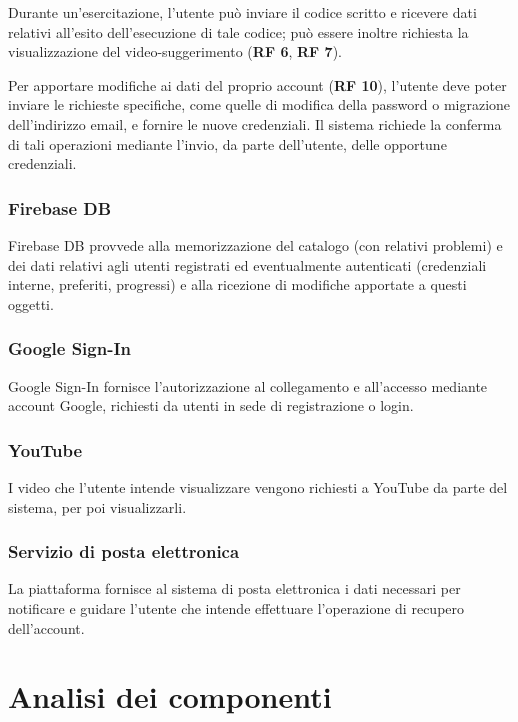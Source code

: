 \documentclass[11pt, a4paper]{article}
\theoremstyle{definition} %
\begin{document}
Durante un'esercitazione, l'utente può inviare il codice scritto e ricevere dati
relativi all'esito dell'esecuzione di tale codice; può essere inoltre richiesta la
visualizzazione del video-suggerimento (\textbf{RF 6}, \textbf{RF 7}).

Per apportare modifiche ai dati del proprio account (\textbf{RF 10}), l'utente
deve poter inviare le richieste specifiche, come quelle di modifica della password
o migrazione dell'indirizzo email, e fornire le nuove credenziali. Il
sistema richiede la conferma di tali operazioni mediante l'invio, da parte
dell'utente, delle opportune credenziali.

\subsubsection*{Firebase DB}
Firebase DB provvede alla memorizzazione del catalogo (con relativi problemi) e dei
dati relativi agli utenti registrati ed eventualmente autenticati (credenziali
interne, preferiti, progressi) e alla ricezione di modifiche apportate a questi oggetti.

\subsubsection*{Google Sign-In}
Google Sign-In fornisce l'autorizzazione al collegamento e all'accesso
mediante account Google, richiesti da utenti in sede di registrazione o
login.

\subsubsection*{YouTube}
I video che l'utente intende visualizzare vengono richiesti a YouTube da
parte del sistema, per poi visualizzarli.

\subsubsection*{Servizio di posta elettronica}
La piattaforma fornisce al sistema di posta elettronica i dati necessari
per notificare e guidare l'utente che intende effettuare l'operazione di
recupero dell'account.



\newpage
\section{Analisi dei componenti}
\end{document}
